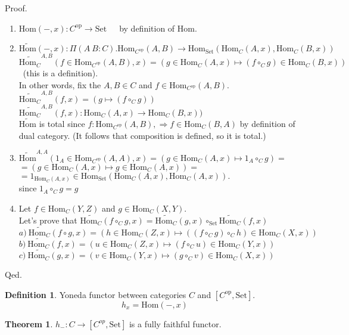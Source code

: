 \documentclass[10pt,a4paper]{article}
\theoremstyle{definition}
\newtheorem{definition}{Definition}[section]
\newtheorem{theorem}{Theorem}[section]
\newcommand{\Hom}{{\mbox{Hom}}}
\newcommand{\op}{{\mbox{op}}}
\newcommand{\Set}{{\mbox{Set}}}
\newcommand{\ra}{{\rightarrow}}
\begin{document}
\noindent Proof.
\begin{enumerate}
\item $\Hom(-, x) : C^\op \ra \Set$\ \ \ by definition of $\Hom$.
\item $\widetilde{\Hom}(-, x) :\Pi(A\ B:C).\Hom_{C^\op}(A,B) \ra \Hom_\Set(\Hom_C(A,x), \Hom_C(B,x))$\\
$\widetilde{\Hom_C}^{A,B}(f\in\Hom_{C^\op}(A,B), x) = (g \in\Hom_C(A,x) \mapsto (f \circ_C g) \in\Hom_C(B,x))$\ (this is a definition).\\
In other words, fix the $A,B\in C$ and $f\in\Hom_{C^\op}(A,B)$.\\
$\widetilde{\Hom_C}^{A,B}(f, x) = (g\mapsto (f \circ_C g))$\\
$\widetilde{\Hom_C}^{A,B}(f, x) : \Hom_C(A,x) \to \Hom_C(B,x))$
\\
$\widetilde{\Hom}$ is total since $f:\Hom_{C^\op}(A,B), \Rightarrow f\in\Hom_C(B,A)$ by definition of dual category. (It follows that composition is defined, so it is total.)
\item $\widetilde{\Hom}^{A,A}(1_A\in\Hom_{C^\op}(A,A), x) = \left(g \in\Hom_C(A,x)\mapsto 1_A \circ_C g\right) = $\\
$= \left(g \in\Hom_C(A,x) \mapsto g \in\Hom_C(A,x)\right) =$\\
$= 1_{\Hom_C(A,x)} \in \Hom_\Set\left(\Hom_C(A,x), \Hom_C(A,x)\right).$\\
since $1_A \circ_C g = g$\\
\item Let $f\in\Hom_C(Y,Z)$ and $g\in\Hom_C(X,Y)$.\\
Let's prove that $\widetilde{\Hom_C}(f\circ_C g, x) = \widetilde{\Hom_C}(g, x) \circ_\Set \widetilde{\Hom_C}(f, x)$\\
$a)\ \widetilde{\Hom_C}(f\circ g, x) = (h \in\Hom_C(Z,x) \mapsto ((f\circ_C g) \circ_C h)\in\Hom_C(X,x))$\\
$b)\ \widetilde{\Hom_C}(f, x) = \left(u \in\Hom_C(Z,x) \mapsto (f \circ_C u)\in\Hom_C(Y,x)\right)$\\
$c)\ \widetilde{\Hom_C}(g, x) = \left(v \in\Hom_C(Y,x) \mapsto (g \circ_C v)\in\Hom_C\left(X,x\right)\right)$\\
\end{enumerate}
Qed.
\begin{definition}
Yoneda functor between categories $C$ and $[C^\op,\Set]$.
$$h_x = \Hom(-, x)$$
\end{definition}
\begin{theorem}
$h_{-}:C\rightarrow [C^{op},\Set]$ is a fully faithful functor.
\end{theorem}
\end{document}
